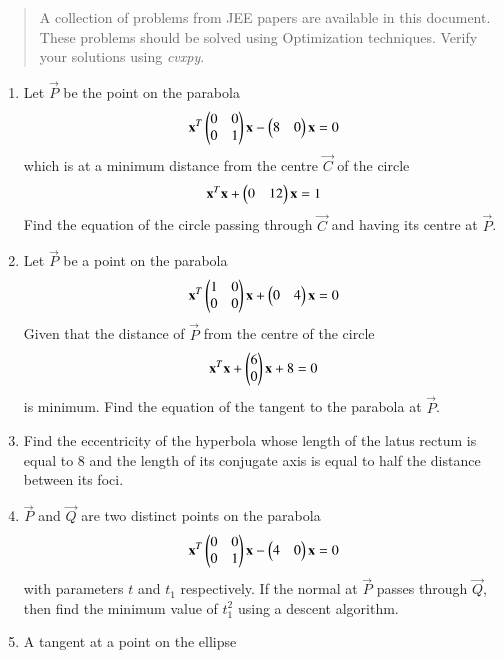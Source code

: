\documentclass[journal,12pt,twocolumn]{IEEEtran}
\begin{document}
\begin{abstract}
	A  collection of problems from JEE papers are 
available in this document.  These problems should be solved using Optimization techniques. Verify your solutions using {\em cvxpy}.
\end{abstract}
\begin{enumerate}[label=\arabic*.]
%

\item Let $\vec{P}$ be the point on the parabola
\begin{equation}
\label{eq:parab_circ_parab}
\mathbf{x}^T\begin{pmatrix}0 & 0 \\ 0 & 1\end{pmatrix}\mathbf{x} -\begin{pmatrix}8 & 0 \end{pmatrix}\mathbf{x} 
 = 0
\end{equation}
which is at a minimum distance from the centre $\vec{C}$ of the circle
\begin{equation}
\label{eq:parab_circ_circ}
\mathbf{x}^T\mathbf{x} +\begin{pmatrix}0 & 12 \end{pmatrix}\mathbf{x} 
 = 1 
\end{equation} 
Find the equation of the circle passing through $\vec{C}$ and having its centre at $\vec{P}$. 
\item Let $\vec{P}$ 
be a point on the parabola
\begin{equation}
\mathbf{x}^T\begin{pmatrix}1 & 0 \\ 0 & 0\end{pmatrix}\mathbf{x} +\begin{pmatrix}0 & 4 \end{pmatrix}\mathbf{x} 
 = 0
\end{equation}
Given that the distance of $\vec{P}$ from the centre of the circle
\begin{equation}
\mathbf{x}^T\mathbf{x} +\begin{pmatrix}6 \\ 0 \end{pmatrix}\mathbf{x} + 8 = 0
\end{equation}
%
is minimum.  Find the equation of the tangent to the parabola at $\vec{P}$.
\item Find the eccentricity of the hyperbola whose length of the latus rectum is equal to 8 and the length of 
its conjugate axis is equal to half the distance between its foci. 
\item $\vec{P}$ and $\vec{Q}$ are two distinct points on the parabola
\begin{equation}
\mathbf{x}^T\begin{pmatrix}0 & 0 \\ 0 & 1\end{pmatrix}\mathbf{x} -\begin{pmatrix}4 & 0 \end{pmatrix}\mathbf{x} 
 = 0
\end{equation}
with parameters $t$ and $t_1$ respectively.  If the normal at $\vec{P} $ passes through $\vec{Q}$, then find 
the minimum value of $t_1^2$ using a descent algorithm.
\item A tangent at a point on the ellipse 
\begin{equation}

\end{equation}
\end{enumerate}
\end{document}
